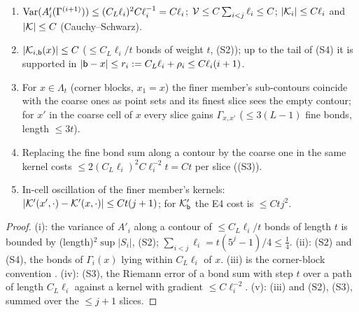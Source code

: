 \begin{lemma}\label{app:a04:lem:C}
\begin{enumerate}[label=\textup{(\roman*)},leftmargin=*]
\item $\operatorname{Var}(A'_i(\Gamma^{(i+1)}))\le(C_L\ell_i)^2C\ell_i^{-1}=C\ell_i$; $\mathcal V\le C\sum_{i<j}\ell_i\le C$; $|\mathcal K_i|\le C\ell_i$ and $|\mathcal K|\le C$ (Cauchy--Schwarz).
\item $|\mathcal K_{i,\mathsf b}(x)|\le C$ ($\le C_L\ell_i/t$ bonds of weight $t$, (S2)); up to the tail of (S4) it is supported in $|\mathsf b-x|\le r_i:= C_L\ell_i+\rho_i\le C\ell_i(i+1)$.
\item For $x\in\Lambda_t$ (corner blocks, $x_1=x$) the finer member's sub-contours coincide with the coarse ones as point sets and its finest slice sees the empty contour; for $x'$ in the coarse cell of $x$ every slice gains $\Gamma_{x,x'}$ ($\le3(L-1)$ fine bonds, length $\le3t$).
\item Replacing the fine bond sum along a contour by the coarse one in the same kernel costs $\le2(C_L\ell_i)^2C\ell_i^{-2}t=Ct$ per slice ((S3)).
\item In-cell oscillation of the finer member's kernels: $|\mathcal K'(x',\cdot)-\mathcal K'(x,\cdot)|\le Ct(j+1)$; for $\mathcal K'_{\mathsf b}$ the E4 cost is $\le Ctj^2$.
\end{enumerate}
\end{lemma}
\begin{proof}
(i): the variance of $A'_i$ along a contour of $\le C_L\ell_i/t$ bonds of length $t$ is bounded by (length)$^2\sup|S_i|$, (S2); $\sum_{i<j}\ell_i=t(5^j-1)/4\le\frac14$. (ii): (S2) and (S4), the bonds of $\Gamma_i(x)$ lying within $C_L\ell_i$ of $x$. (iii) is the corner-block convention \cite[(2.12), (2.19)]{K1}. (iv): (S3), the Riemann error of a bond sum with step $t$ over a path of length $C_L\ell_i$ against a kernel with gradient $\le C\ell_i^{-2}$. (v): (iii) and (S2), (S3), summed over the $\le j+1$ slices.
\end{proof}

